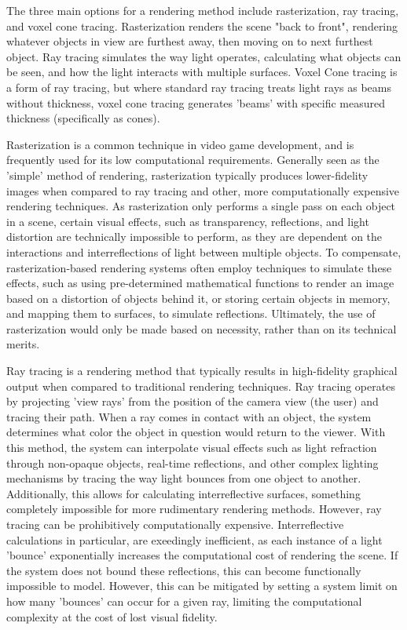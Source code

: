 \documentclass[onecolumn, draftclsnofoot,10pt, compsoc]{IEEEtran}
\newcounter{threesection}[subsubsection]
\newcounter{foursection}[threesection]
\begin{document}
The three main options for a rendering method include rasterization, ray tracing, and voxel cone tracing. Rasterization renders the scene "back to front", rendering whatever objects in view are furthest away, then moving on to next furthest object. Ray tracing simulates the way light operates, calculating what objects can be seen, and how the light interacts with multiple surfaces. Voxel Cone tracing is a form of ray tracing, but where standard ray tracing treats light rays as beams without thickness, voxel cone tracing generates 'beams' with specific measured thickness (specifically as cones).

Rasterization is a common technique in video game development, and is frequently used for its low computational requirements. Generally seen as the 'simple' method of rendering, rasterization typically produces lower-fidelity images when compared to ray tracing and other, more computationally expensive rendering techniques. As rasterization only performs a single pass on each object in a scene, certain visual effects, such as transparency, reflections, and light distortion are technically impossible to perform, as they are dependent on the interactions and interreflections of light between multiple objects. To compensate, rasterization-based rendering systems often employ techniques to simulate these effects, such as using pre-determined mathematical functions to render an image based on a distortion of objects behind it, or storing certain objects in memory, and mapping them to surfaces, to simulate reflections. Ultimately, the use of rasterization would only be made based on necessity, rather than on its technical merits.

Ray tracing is a rendering method that typically results in high-fidelity graphical output when compared to traditional rendering techniques. Ray tracing operates by projecting 'view rays' from the position of the camera view (the user) and tracing their path. When a ray comes in contact with an object, the system determines what color the object in question would return to the viewer. With this method, the system can interpolate visual effects such as light refraction through non-opaque objects, real-time reflections, and other complex lighting mechanisms by tracing the way light bounces from one object to another. Additionally, this allows for calculating interreflective surfaces, something completely impossible for more rudimentary rendering methods. However, ray tracing can be prohibitively computationally expensive. Interreflective calculations in particular, are exeedingly inefficient, as each instance of a light 'bounce' exponentially increases the computational cost of rendering the scene. If the system does not bound these reflections, this can become functionally impossible to model. However, this can be mitigated by setting a system limit on how many 'bounces' can occur for a given ray, limiting the computational complexity at the cost of lost visual fidelity. 
\end{document}
